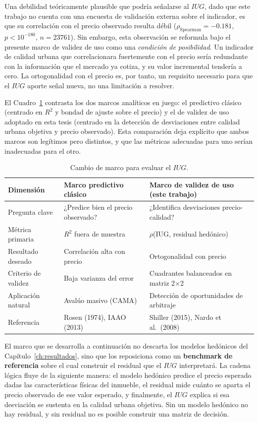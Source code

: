 \documentclass[12pt, a4paper, twoside, openright]{report}
\theoremstyle{plain}
\theoremstyle{definition}
\newcommand{\IUG}{IUG}             %
\begin{document}
Una debilidad teóricamente plausible que podría señalarse al $\IUG{}$, dado que este trabajo no cuenta con una encuesta de validación externa sobre el indicador, es que su correlación con el precio observado resulta débil ($\rho_{\text{Spearman}} = -0.181$, $p < 10^{-180}$, $n = \num{23761}$). Sin embargo, esta observación se reformula bajo el presente marco de validez de uso como una \emph{condición de posibilidad}. Un indicador de calidad urbana que correlacionara fuertemente con el precio sería redundante con la información que el mercado ya cotiza, y su valor incremental tendería a cero. La ortogonalidad con el precio es, por tanto, un requisito necesario para que el $\IUG{}$ aporte señal nueva, no una limitación a resolver.

El Cuadro~\ref{tab:cambio_marco} contrasta los dos marcos analíticos en juego: el predictivo clásico (centrado en $R^2$ y bondad de ajuste sobre el precio) y el de validez de uso adoptado en esta tesis (centrado en la detección de desviaciones entre calidad urbana objetiva y precio observado). Esta comparación deja explícito que ambos marcos son legítimos pero distintos, y que las métricas adecuadas para uno serían inadecuadas para el otro.

\begin{table}[htbp]
\centering
\caption{Cambio de marco para evaluar el $\IUG$.}
\label{tab:cambio_marco}
\small
\begin{tabular}{@{}p{3.2cm}p{5.2cm}p{5.2cm}@{}}
\toprule
\textbf{Dimensión} & \textbf{Marco predictivo clásico} & \textbf{Marco de validez de uso (este trabajo)} \\
\midrule
Pregunta clave & ¿Predice bien el precio observado? & ¿Identifica desviaciones precio-calidad? \\
Métrica primaria & $R^2$ fuera de muestra & $\rho$(IUG, residual hedónico) \\
Resultado deseado & Correlación alta con precio & Ortogonalidad con precio \\
Criterio de validez & Baja varianza del error & Cuadrantes balanceados en matriz 2$\times$2 \\
Aplicación natural & Avalúo masivo (CAMA) & Detección de oportunidades de arbitraje \\
Referencia & Rosen (1974), IAAO (2013) & Shiller (2015), Nardo et al.\ (2008) \\
\bottomrule
\end{tabular}
\end{table}

El marco que se desarrolla a continuación no descarta los modelos hedónicos del Capítulo~\ref{ch:resultados}, sino que los reposiciona como un \textbf{benchmark de referencia} sobre el cual construir el residual que el $\IUG$ interpretará. La cadena lógica fluye de la siguiente manera: el modelo hedónico predice el precio esperado dadas las características físicas del inmueble, el residual mide cuánto se aparta el precio observado de ese valor esperado, y finalmente, el $\IUG$ explica si esa desviación se sustenta en la calidad urbana objetiva. Sin un modelo hedónico no hay residual, y sin residual no es posible construir una matriz de decisión.
\end{document}
